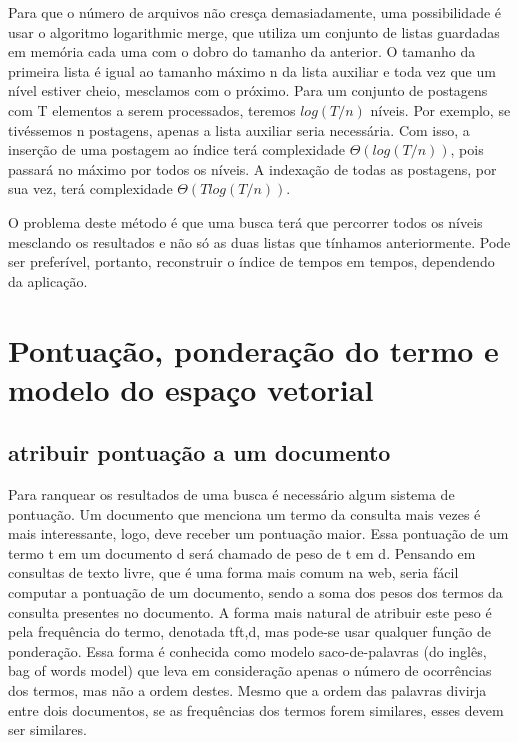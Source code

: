 Para que o número de arquivos não cresça demasiadamente, uma possibilidade é usar o algoritmo logarithmic merge, que utiliza um conjunto de listas guardadas em memória cada uma com o dobro do tamanho da anterior. O tamanho da primeira lista é igual ao tamanho máximo n da lista auxiliar e toda vez que um nível estiver cheio, mesclamos com o próximo. Para um conjunto de postagens com T elementos a serem processados, teremos $log( T/n )$ níveis. Por exemplo, se tivéssemos n postagens, apenas a lista auxiliar seria necessária. Com isso, a inserção de uma postagem ao índice terá complexidade $\Theta( log( T/n ))$, pois passará no máximo por todos os níveis. A indexação de todas as postagens, por sua vez, terá complexidade $\Theta( T log(T/n ))$.

O problema deste método é que uma busca terá que percorrer todos os níveis mesclando os resultados e não só as duas listas que tínhamos anteriormente. Pode ser preferível, portanto, reconstruir o índice de tempos em tempos, dependendo da aplicação.




\section{Pontuação, ponderação do termo e modelo do espaço vetorial}
\label{sec:espaco_vetorial}

\subsection{atribuir pontuação a um documento}

Para ranquear os resultados de uma busca é necessário algum sistema de pontuação. Um documento que menciona um termo da consulta mais vezes é mais interessante, logo, deve receber um pontuação maior. Essa pontuação de um termo t em um documento d será chamado de peso de t em d. Pensando em consultas de texto livre, que é uma forma mais comum na web, seria fácil computar a pontuação de um documento, sendo a soma dos pesos dos termos da consulta presentes no documento. A forma mais natural de atribuir este peso é pela frequência do termo, denotada tft,d, mas pode-se usar qualquer função de ponderação. Essa forma é conhecida como modelo saco-de-palavras (do inglês, bag of words model) que leva em consideração apenas o número de ocorrências dos termos, mas não a ordem destes. Mesmo que a ordem das palavras divirja entre dois documentos, se as frequências dos termos forem similares, esses devem ser similares.

